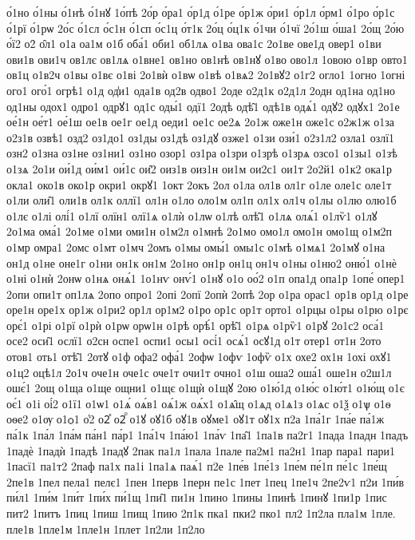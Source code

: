 {о́1но
о́1ны
о́1нѣ
о́1нꙋ
1о́пѣ
2о́р
о́ра1
о́р1д
о́1ре
о́р1ж
о́ри1
о́р1л
о́рм1
о́1ро
о́р1с
о́1рї
о́1рѡ
2о́с
о́1сл
о́с1н
о́1сп
о́с1ц
о́т1к
2о́ц
о́ц1к
о́1чи
о́1чї
2о́1ш
о́ша1
2о́щ
2о́ю
о́ї2
о2̑
о̑л1
о1а
оа1м
о1б
оба́1
оби1
об1лѧ
о1ва
ова1с
2о1ве
ове1д
овер1
о1ви
ови1в
ови1ч
ов1лє
ов1лѧ
о1вне1
ов1но
ов1нѣ
ов1нꙋ
о1во
ово1л
1овою
о1вр
овто1
ов1ц
о1в2ч
о1вы
о1вє
о1ві
2о1вѝ
о1вѡ
о1вѣ
о1вѧ2
2о1вꙋ2
о1г2
огло1
1огно
1огні
ого1
ого́1
огрѣ1
о1д
од̾и1
ода1в
од2в
одво1
2оде
о2д1к
о2д1л
2одн
од1на
од1но
од1ны
одох1
одро1
одрꙋ1
од1с
оды́1
одї1
2одѣ
одѣ̑1
одѣ1в
одѧ́1
одꙋ2
одꙋх1
2о1е
ое́1н
ое́т1
ое́1ш
ое1в
ое1г
ое1д
оеди1
ое1с
ое2ѧ
2о1ж
оже1н
оже1с
о2ж1ж
о1за
о2з1в
озвѣ1
озд2
оз1до1
оз1ды
оз1дѣ
оз1дꙋ
озже1
о1зи
ози́1
о2з1л2
озла1
озлї1
озн2
о1зна
оз1не
оз1ни1
оз1но
озор1
оз1ра
о1зри
о1зрѣ
о1зрѧ
озсо1
о1зы1
о1зѣ
о1зѧ
2о1и
ои́1д
ои́м1
ои́1с
ои̑2
оиз1в
оиз1н
ои1м
ои2с1
ои1т
2о2й1
о1к2
ока1р
окла1
око1в
око1р
окри1
окрꙋ1
1окт
2окъ
2ол
о1ла
ол1в
ол1г
о1ле
оле1с
оле1т
о1ли
оли̑1
оли1в
ол1к
оллї1
ол1н
о1ло
оло1м
ол1п
ол1х
ол1ч
о1лы
о1лю
олю1б
о1лє
о1лі
олі́1
о1лї
олїн1
олї1ѧ
о1лѝ
о1лѡ
о1лѣ
олѣ̑1
о1лѧ
олѧ́1
о1лѷ1
о1лꙋ
2о1ма
ома́1
2о1ме
о1ми
оми1н
о1м2л
о1мнѣ
2о1мо
омо1л
омо1н
омо1щ
о1м2п
о1мр
омра1
2омс
о1мт
о1мч
2омъ
о1мы
омы́1
омы1с
о1мѣ
о1мѧ1
2о1мꙋ
о1на
он1д
о1не
оне1г
о1ни
он1к
он1м
2о1но
он1р
он1ц
он1ч
о1ны
о1ню2
оню́1
о1нѐ
о1ні
о1нѝ
2онѡ
о1нѧ
онѧ́1
1о1нѵ
онѵ́1
о1нꙋ
о1о
оо́2
о1п
опа1д
опа1р
1опе́
опер1
2опи
опи1т
оп1лѧ
2опо
опро1
2опі
2опї
2опѝ
2опѣ
2ор
о1ра
орас1
ор1в
ор1д
о1ре
оре1н
оре1х
ор1ж
о1ри2
ор1л
ор1м2
о1ро
ор1с
ор1т
орто1
о1рцы
о1ры
о1рю
о1рє
орє́1
о1рі
о1рї
о1рѝ
о1рѡ
орѡ1н
о1рѣ
орѣ́1
орѣ̑1
о1рѧ
о1рѷ1
о1рꙋ
2о1с2
оса́1
осе2
оси̑1
ослї1
о2сн
оспе1
оспи1
осы1
осі́1
осѧ́1
осꙋ1д
о1т
отер1
от1н
2ото
отов1
оть1
отѣ̑1
2отꙋ
о1ф
офа2
офа́1
2офѡ
1офѵ
1офѷ
о1х
охе2
ох1н
1охі
охꙋ1
о1ц2
оцѣ1л
2о1ч
оче1н
оче1с
оче1т
очи1т
очно1
о1ш
оша2
оша́1
оше1н
о2ш1л
ошє́1
2ощ
о1ща
о1ще
ощни1
о1щє
о1щѝ
о1щꙋ
2ою
о1ю́1д
о1ю́с
о1ю́т1
о1ю́щ
о1є
оє́1
о1і
оі́2
о1ї1
о1ѡ1
о1ѧ́
оѧ́в1
оѧ́1ж
оѧ́х1
о1ѧ̑щ
о1ѧд
о1ѧ1з
о1ѧс
о1ѯ
о1ѱ
о1ѳ
оѳе2
о1ѹ
о1ѻ1
о҆2
о2ⷦ
о2ⷬ
о1ꙋ
оꙋ1б
оꙋ1в
оꙋме1
оꙋ1т
оꙋ1х
п2а
1па́1г
1па́е
па́1ж
па́1к
1па́л
1па́м
па́н1
па́р1
1па́1ч
1па́ю1
1па́ѵ
1па̑1
1па1в
па2г1
1пада
1падн
1падъ
1падѐ
1падѝ
1падѣ
1падꙋ
2пак
па1л
1пала
1пале
па2м1
па2н1
1пар
пара1
пари1
1пасї1
па1т2
2паф
па1х
па1і
1па1ѧ
паѧ́1
п2е
1пе́в
1пе́1з
1пе́м
пе́1п
пе́1с
1пе́щ
2пе1в
1пел
пела1
пелє1
1пен
1перв
1перн
пе1с
1пет
1пец
1пе1ч
2пе2ѵ1
п2и
1пи́в
пи́л1
1пи́м
1пи́т
1пи́х
пи́1щ
1пи̑1
пи1н
1пино
1пины
1пинѣ
1пинꙋ
1пи1р
1пис
пит2
1питъ
1пиц
1пиш
1пищ
1пию
2п1к
пка1
пки2
пко1
пл2
1п2ла
пла1м
1пле.
пле1в
1пле1м
1пле1н
1плет
1п2ли
1п2ло
}
